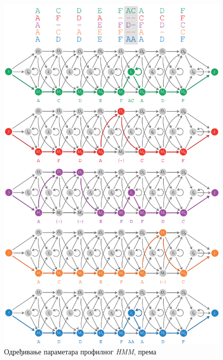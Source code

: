 \documentclass[12pt,oneside]{memoir}
\begin{document}
\begin{CJK}{UTF8}{ipxm}
\begin{figure}[!ht]
  \centering
  \includegraphics[height=.97\textheight]{prof_param.png}
  \caption{Одређивање параметара профилног \textit{HMM}, према \cite{compeau2015}}
  \label{fig:prof_param}
\end{figure}



\end{CJK}
\end{document}
